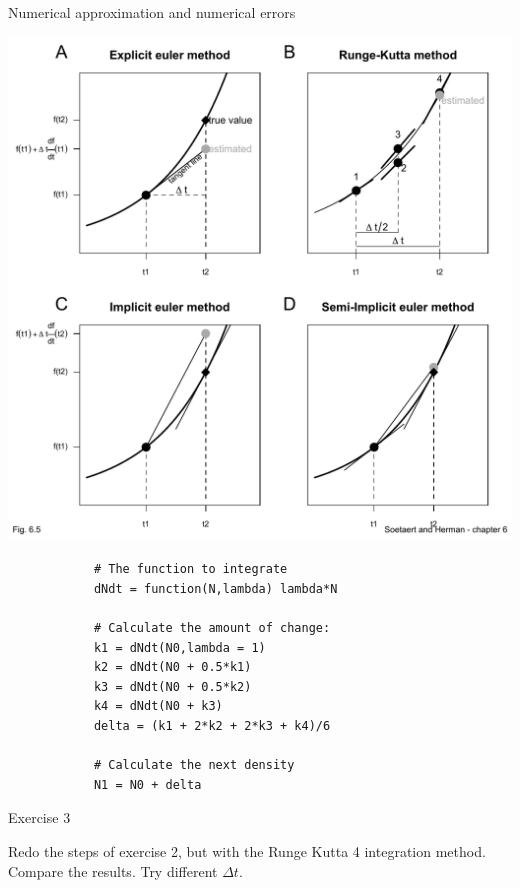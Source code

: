 \documentclass{eecslides}
\begin{document}

	\begin{frame}[fragile]{Numerical approximation and numerical errors}
		\begin{center}
			\includegraphics[height=0.55\textheight]{fig6_5}
		\end{center}
	\end{frame}


	\begin{frame}[fragile]
		
		\begin{lstlisting}
			# The function to integrate
			dNdt = function(N,lambda) lambda*N

			# Calculate the amount of change:
			k1 = dNdt(N0,lambda = 1)
			k2 = dNdt(N0 + 0.5*k1)
			k3 = dNdt(N0 + 0.5*k2)
			k4 = dNdt(N0 + k3)
			delta = (k1 + 2*k2 + 2*k3 + k4)/6

			# Calculate the next density
			N1 = N0 + delta

		\end{lstlisting}

	\end{frame}


	\begin{frame}{Exercise 3}
			
		Redo the steps of exercise 2, but with the Runge Kutta 4 integration method. Compare the results. Try different $\Delta t$.
	\end{frame}
\end{document}
